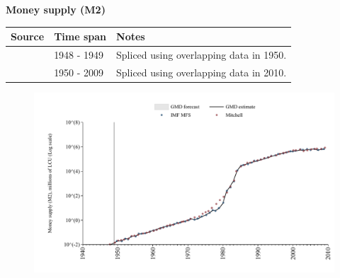 \documentclass[12pt,a4paper,landscape]{article}
\begin{document}
\begin{adjustbox}{max totalsize={\paperwidth}{\paperheight},center}
\begin{minipage}[t][\textheight][t]{\textwidth}
\vspace*{0.5cm}
{}
\begin{center}
{\Large\bfseries Money supply (M2)}
\end{center}
\vspace{0.5cm}
\begin{table}[H]
\centering
\small
\begin{tabular}{|l|l|l|}
\hline
\textbf{Source} & \textbf{Time span} & \textbf{Notes} \\
\hline
\rowcolor{white}\cite{Mitchell}& 1948 - 1949 &Spliced using overlapping data in 1950. \\
\rowcolor{lightgray}\cite{IMF_MFS}& 1950 - 2009 &Spliced using overlapping data in 2010. \\
\hline
\end{tabular}
\end{table}
\begin{figure}[H]
\centering
\includegraphics[width=\textwidth,height=0.6\textheight,keepaspectratio]{graphs/ISR_M2.pdf}
\end{figure}
\end{minipage}
\end{adjustbox}
\end{document}
